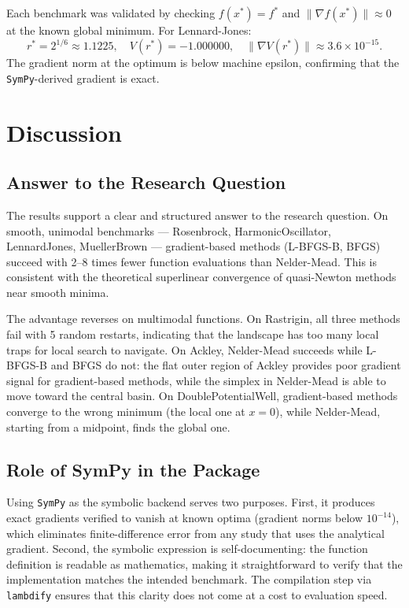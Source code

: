 Each benchmark was validated by checking $f(x^*) = f^*$ and
$\|\nabla f(x^*)\| \approx 0$ at the known global minimum. For Lennard-Jones:
\begin{equation}
r^* = 2^{1/6} \approx 1.1225, \quad
V(r^*) = -1.000000, \quad
\|\nabla V(r^*)\| \approx 3.6 \times 10^{-15}.
\end{equation}
The gradient norm at the optimum is below machine epsilon, confirming
that the \texttt{SymPy}-derived gradient is exact.

\clearpage

\section{Discussion}

\subsection{Answer to the Research Question}

The results support a clear and structured answer to the research question.
On smooth, unimodal benchmarks — Rosenbrock, HarmonicOscillator,
LennardJones, MuellerBrown — gradient-based methods (L-BFGS-B, BFGS)
succeed with 2--8 times fewer function evaluations than Nelder-Mead.
This is consistent with the theoretical superlinear convergence of
quasi-Newton methods near smooth minima.

The advantage reverses on multimodal functions. On Rastrigin, all three
methods fail with 5 random restarts, indicating that the landscape has
too many local traps for local search to navigate. On Ackley,
Nelder-Mead succeeds while L-BFGS-B and BFGS do not: the flat outer
region of Ackley provides poor gradient signal for gradient-based methods,
while the simplex in Nelder-Mead is able to move toward the central basin.
On DoublePotentialWell, gradient-based methods converge to the wrong
minimum (the local one at $x=0$), while Nelder-Mead, starting from a
midpoint, finds the global one.

\subsection{Role of SymPy in the Package}

Using \texttt{SymPy} as the symbolic backend serves two purposes. First,
it produces exact gradients verified to vanish at known optima (gradient
norms below $10^{-14}$), which eliminates finite-difference error from any
study that uses the analytical gradient. Second, the symbolic expression is
self-documenting: the function definition is readable as mathematics, making
it straightforward to verify that the implementation matches the intended
benchmark. The compilation step via \texttt{lambdify} ensures that this
clarity does not come at a cost to evaluation speed.

